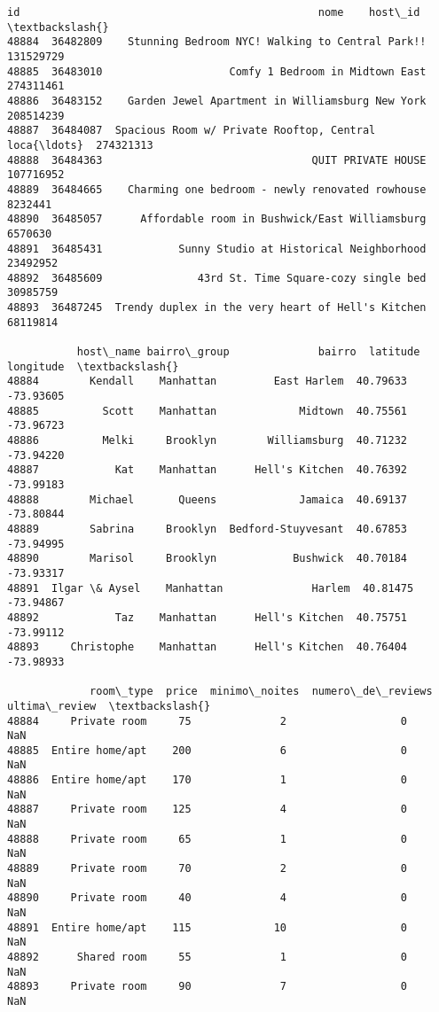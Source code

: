\documentclass[11pt]{article}
\makeatletter
\newcommand{\boxspacing}{\kern\kvtcb@left@rule\kern\kvtcb@boxsep}
\newcommand{\prompt}[4]{
        {\ttfamily\llap{{\color{#2}[#3]:\hspace{3pt}#4}}\vspace{-\baselineskip}}
    }
\makeatother
\begin{document}
            \begin{tcolorbox}[breakable, size=fbox, boxrule=.5pt, pad at break*=1mm, opacityfill=0]
\prompt{Out}{outcolor}{213}{\boxspacing}
\begin{Verbatim}[commandchars=\\\{\}]
             id                                               nome    host\_id  \textbackslash{}
48884  36482809    Stunning Bedroom NYC! Walking to Central Park!!  131529729
48885  36483010                    Comfy 1 Bedroom in Midtown East  274311461
48886  36483152    Garden Jewel Apartment in Williamsburg New York  208514239
48887  36484087  Spacious Room w/ Private Rooftop, Central loca{\ldots}  274321313
48888  36484363                                 QUIT PRIVATE HOUSE  107716952
48889  36484665    Charming one bedroom - newly renovated rowhouse    8232441
48890  36485057      Affordable room in Bushwick/East Williamsburg    6570630
48891  36485431            Sunny Studio at Historical Neighborhood   23492952
48892  36485609               43rd St. Time Square-cozy single bed   30985759
48893  36487245  Trendy duplex in the very heart of Hell's Kitchen   68119814

           host\_name bairro\_group              bairro  latitude  longitude  \textbackslash{}
48884        Kendall    Manhattan         East Harlem  40.79633  -73.93605
48885          Scott    Manhattan             Midtown  40.75561  -73.96723
48886          Melki     Brooklyn        Williamsburg  40.71232  -73.94220
48887            Kat    Manhattan      Hell's Kitchen  40.76392  -73.99183
48888        Michael       Queens             Jamaica  40.69137  -73.80844
48889        Sabrina     Brooklyn  Bedford-Stuyvesant  40.67853  -73.94995
48890        Marisol     Brooklyn            Bushwick  40.70184  -73.93317
48891  Ilgar \& Aysel    Manhattan              Harlem  40.81475  -73.94867
48892            Taz    Manhattan      Hell's Kitchen  40.75751  -73.99112
48893     Christophe    Manhattan      Hell's Kitchen  40.76404  -73.98933

             room\_type  price  minimo\_noites  numero\_de\_reviews ultima\_review  \textbackslash{}
48884     Private room     75              2                  0           NaN
48885  Entire home/apt    200              6                  0           NaN
48886  Entire home/apt    170              1                  0           NaN
48887     Private room    125              4                  0           NaN
48888     Private room     65              1                  0           NaN
48889     Private room     70              2                  0           NaN
48890     Private room     40              4                  0           NaN
48891  Entire home/apt    115             10                  0           NaN
48892      Shared room     55              1                  0           NaN
48893     Private room     90              7                  0           NaN


\end{Verbatim}
\end{tcolorbox}
\end{document}

